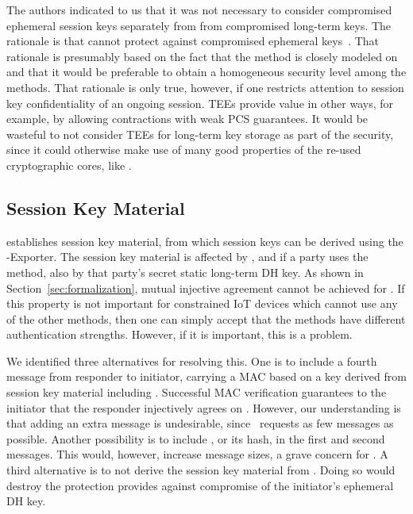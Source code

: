 \documentclass[runningheads, envcountsame, hidelinks, a4paper, draft, x11names]{llncs}
\begin{document}
The \mEdhoc{} authors indicated to us that it was
not necessary to consider compromised ephemeral session keys separately from
from compromised long-term keys.
%
The rationale is that \mSigma{} cannot protect against compromised ephemeral
keys~\cite{personalCommunication}.
%
That rationale is presumably based on the fact that the \mSigSig{} method is
closely modeled on \mSigmaI{} and that it would be preferable to obtain a
homogeneous security level among the \mEdhoc{}
methods.
%
That rationale is only true, however, if one restricts attention to session key
confidentiality of an ongoing session.
%
TEEs provide value in other ways, for example, by allowing contractions with
weak PCS guarantees.
%
It would be wasteful to not consider TEEs for long-term key storage as part of
the security, since it could otherwise make use of many good properties of the
re-used cryptographic cores, like \mOptls.
%
%

\subsection{Session Key Material}
\label{sec:sessionKeyMaterial}
\mEdhoc{} establishes session key material, from which session keys
can be derived using the \mEdhoc{}-Exporter.
%
The session key material is affected by \mGxy{}, and if a party uses the
\mStat{} method, also by that party's secret static long-term DH key.
%
As shown in Section~\ref{sec:formalization}, mutual injective agreement cannot
be achieved for \mGiy{}.
%
If this property is not important for constrained IoT devices which cannot use
any of the other methods, then one can simply accept that the methods have
different authentication strengths.
%
However, if it is important, this is a problem.
%

We identified three alternatives for resolving this.
%
One is to include a fourth message from responder to initiator,
carrying a MAC based on a key derived from session key
material including \mGiy{}.
%
Successful MAC verification guarantees
to the initiator that the responder injectively agrees on \mGiy{}.
%
However, our understanding is that adding an extra message is
undesirable, since~\cite{selander-lake-edhoc-01} requests as few messages as
possible.
%
Another possibility is to include \mGi{}, or its hash, in the first and
second messages.
%
This would, however, increase message sizes, a grave concern for \mEdhoc{}.
%
A third alternative is to not derive the session key material from \mGiy{}.
%
Doing so would destroy the protection \mOptls{} provides against compromise
of the initiator's ephemeral DH key.
%
\end{document}
